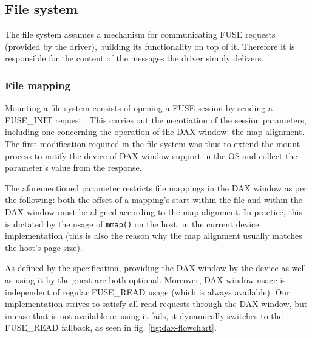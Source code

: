\subsection{File system}

The \viofs{} file system assumes a mechanism for communicating FUSE requests
(provided by the driver), building its functionality on top of it. Therefore
it is responsible for the content of the messages the driver simply delivers.

\subsubsection{File mapping}

Mounting a \viofs{} file system consists of opening a FUSE session by sending a
FUSE\_INIT request \cite{virtio}. This carries out the negotiation of the
session parameters, including one concerning the operation of the DAX window:
the map alignment. The first modification required in the file system was thus
to extend the mount process to notify the device of DAX window support in the
OS and collect the parameter's value from the response.

The aforementioned parameter restricts file mappings in the DAX window as per
the following: both the offset of a mapping's start within the file and within
the DAX window must be aligned according to the map alignment. In practice, this
is dictated by the usage of \texttt{mmap()} \cite{man:mmap} on the host, in the
current device implementation (this is also the reason why the map alignment
usually matches the host's page size).

As defined by the specification, providing the DAX window by the device as well
as using it by the guest are both optional. Moreover, DAX window usage is
independent of regular FUSE\_READ usage (which is always available). Our
implementation strives to satisfy all read requests through the DAX window, but
in case that is not available or using it fails, it dynamically switches to the
FUSE\_READ fallback, as seen in fig. \ref{fig:dax-flowchart}.

